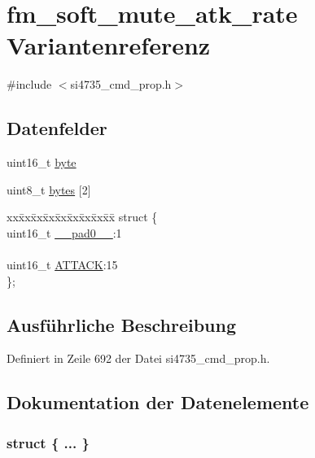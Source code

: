 \hypertarget{unionfm__soft__mute__atk__rate}{}\section{fm\+\_\+soft\+\_\+mute\+\_\+atk\+\_\+rate Variantenreferenz}
\label{unionfm__soft__mute__atk__rate}


{\ttfamily \#include $<$si4735\+\_\+cmd\+\_\+prop.\+h$>$}

\subsection*{Datenfelder}
\begin{DoxyCompactItemize}
\item 
uint16\+\_\+t \hyperlink{unionfm__soft__mute__atk__rate_ab0549c1b5ea980a02e7eab77e21fea49}{byte}
\item 
uint8\+\_\+t \hyperlink{unionfm__soft__mute__atk__rate_a46e4c05d20a047ec169f60d3167e912e}{bytes} \mbox{[}2\mbox{]}
\item 
\begin{tabbing}
xx\=xx\=xx\=xx\=xx\=xx\=xx\=xx\=xx\=\kill
struct \{\\
\>uint16\_t \hyperlink{unionfm__soft__mute__atk__rate_a77132c2c26a75f5b8751b235cda23828}{\_\_pad0\_\_}:1\\
\>\\
\>uint16\_t \hyperlink{unionfm__soft__mute__atk__rate_a23a6aee9d921440c53996214126047a3}{ATTACK}:15\\
\}; \\

\end{tabbing}\end{DoxyCompactItemize}


\subsection{Ausführliche Beschreibung}


Definiert in Zeile 692 der Datei si4735\+\_\+cmd\+\_\+prop.\+h.



\subsection{Dokumentation der Datenelemente}
\hypertarget{unionfm__soft__mute__atk__rate_a54c4f0d6cb18e7034af9d5ea884366e0}{}\subsubsection[{"@83}]{\setlength{\rightskip}{0pt plus 5cm}struct \{ ... \} }\label{unionfm__soft__mute__atk__rate_a54c4f0d6cb18e7034af9d5ea884366e0}
\hypertarget{unionfm__soft__mute__atk__rate_a77132c2c26a75f5b8751b235cda23828}{}
